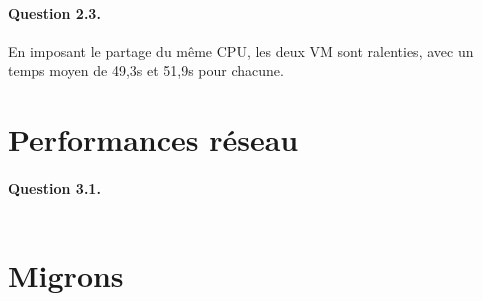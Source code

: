 \documentclass[a4paper]{article}
\begin{document}
\paragraph{Question 2.3.} En imposant le partage du même CPU, les deux VM sont ralenties, avec un temps moyen de 49,3s et 51,9s pour chacune.

\section{Performances réseau}
\paragraph{Question 3.1.}
\begin{center}
\begin{tabular}{c c}

\end{tabular}
\end{center}

\section{Migrons}
\end{document}
